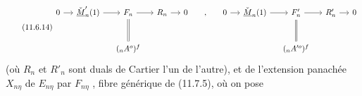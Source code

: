 \begin{equation}\tag{11.6.14}
\begin{tikzcd}[column sep=small, row sep=large]
0 \arrow[r] & \check{\underline{M}}'_n(1) \arrow[r] & F_n \arrow[r] \arrow[d, equal] & R_n \arrow[r] & 0 & , & 0 \arrow[r] & \check{\underline{M}}_n(1) \arrow[r] & F'_n \arrow[r] \arrow[d, equal] & R'_n \arrow[r] & 0 \\
& & ({}_nA^o)^f & & & & & & ({}_nA'^o)^f & &
\end{tikzcd}
\end{equation}
(où $R_n$ et $R'_n$ sont duals de Cartier l'un de l'autre), et de l'extension panachée $X_{n\eta}$ de $E_{n\eta}$ par $F_{n\eta}$ , fibre générique de (11.7.5), où on pose


